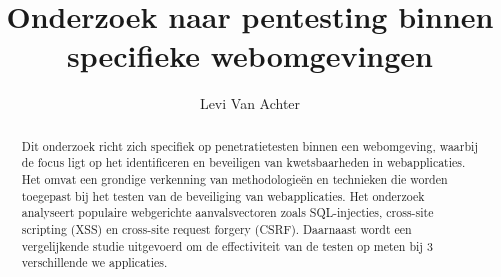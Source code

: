 \documentclass{hogent-article}
\title{Onderzoek naar pentesting binnen specifieke webomgevingen}
\author{Levi Van Achter}
\begin{document}
\begin{abstract}
  Dit onderzoek richt zich specifiek op penetratietesten binnen een webomgeving, waarbij de focus ligt op het
identificeren en beveiligen van kwetsbaarheden in webapplicaties. Het omvat een grondige verkenning van
methodologieën en technieken die worden toegepast bij het testen van de beveiliging van webapplicaties. Het
onderzoek analyseert populaire webgerichte aanvalsvectoren zoals SQL-injecties, cross-site scripting (XSS) en
cross-site request forgery (CSRF). Daarnaast wordt een vergelijkende studie uitgevoerd om de effectiviteit van
de testen op meten bij 3 verschillende we applicaties.
\end{abstract}

\tableofcontents



\printbibliography[heading=bibintoc]
\end{document}
